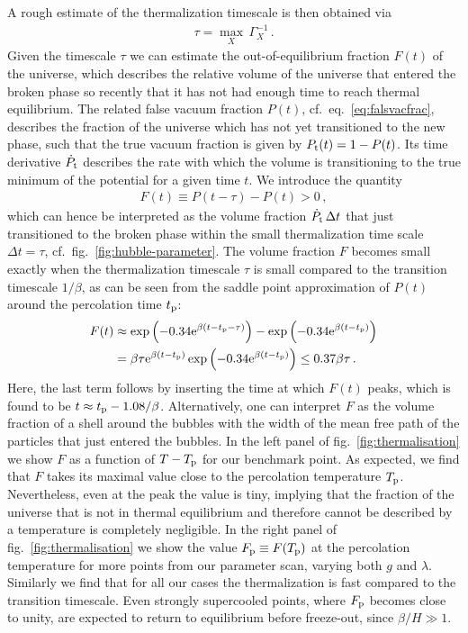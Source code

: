 A rough estimate of the thermalization timescale is then obtained via 
\begin{align}
	\tau = \max_X \, \Gamma_X^{-1} \, .
\end{align}
Given the timescale $\tau$ we can estimate the out-of-equilibrium fraction $F(t)$ of the universe, which describes the relative volume of the universe that entered the broken phase so recently that it has not had enough time to reach thermal equilibrium. The related
false vacuum fraction $P(t)$, cf.~eq.~\eqref{eq:falsvacfrac}, describes the fraction of the universe which has not yet transitioned to the new phase, such that the true vacuum  fraction is given by $P_{\text{t}}(t) = 1 - P(t)$. Its time derivative $\dot{P}_{\text{t}}$ describes the rate with which the volume is transitioning to the true minimum of the potential for a given time $t$. We introduce the quantity
\begin{align}
	F(t) \equiv P(t - \tau) - P(t) > 0\,,
\end{align}
which can hence be interpreted as the volume fraction $\dot{P}_{\text{t}} \, \Delta t$ that just transitioned to the broken phase within the small thermalization time scale $\Delta t = \tau$, cf.~fig.~\ref{fig:hubble-parameter}. The volume fraction $F$ becomes small exactly when the thermalization timescale $\tau$ is small compared to the transition timescale $1/\beta$, as can be seen from the saddle point approximation of $P(t)$ around the percolation time $t_{\text{p}}$:
\begin{align}
	\begin{split}
		F(t) &\approx \exp \left( -0.34 \mathrm{e}^{\beta(t - t_{\text{p}} - \tau)} \right) -
		\exp \left( -0.34 \mathrm{e}^{\beta(t-t_{\text{p}})} \right)  \\
		&= \beta \tau \mathrm{e}^{\beta(t - t_{\text{p}})} \exp \left( -0.34 \mathrm{e}^{\beta(t - t_{\text{p}})} \right) \leq 0.37 \beta\tau\, .
	\end{split}
\end{align}
Here, the last term follows by inserting the time at which $F(t)$ peaks, which is found to be $t \approx t_{\text{p}} - 1.08/\beta$.  Alternatively, one can interpret $F$ as the volume fraction of a shell around the bubbles with the width of the mean free path of the particles that just entered the bubbles. In the left panel of fig.~\ref{fig:thermalisation} we show $F$ as a function of $T - T_{\text{p}}$ for our benchmark point. As expected, we find that $F$ takes its maximal value close to the  percolation temperature $T_{\text{p}}$. Nevertheless, even at the peak the value is tiny, implying that the fraction of the universe that is not in thermal equilibrium and therefore cannot be described by a temperature is completely negligible. In the right panel of fig.~\ref{fig:thermalisation} we show the value $F_{\text{p}} \equiv F(T_{\text{p}})$ at the percolation temperature for more points from our parameter scan, varying both $g$
and $\lambda$. Similarly we find that for all our cases the thermalization is fast compared to the transition timescale. Even strongly supercooled points, where $F_{\text{p}}$ becomes close to unity, are expected to return to equilibrium before freeze-out, since $\beta/H \gg 1$.

